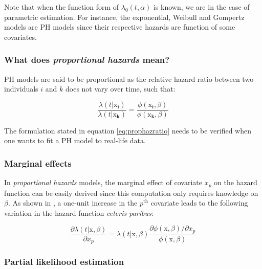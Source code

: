 \documentclass[
]{book}
\begin{document}
Note that when the function form of \(\lambda_0 (t,\alpha)\) is known, we are in the case of parametric estimation. For instance, the exponential, Weibull and Gompertz models are PH models since their respective hazards are function of some covariates.

\hypertarget{what-does-proportional-hazards-mean}{%
\subsubsection*{\texorpdfstring{What does \emph{proportional hazards} mean?}{What does proportional hazards mean?}}\label{what-does-proportional-hazards-mean}}

PH models are said to be proportional as the relative hazard ratio between two individuals \(i\) and \(k\) does not vary over time, such that:

\begin{equation}
  \frac{\lambda(t|\pmb{\mathrm{x}_i})}{\lambda(t|\pmb{\mathrm{x}_k})} = \frac{\phi(\pmb{\mathrm{x}_i}, \beta) }{\phi(\pmb{\mathrm{x}_k}, \beta)}
  \label{eq:prophazratio}
\end{equation}

The formulation stated in equation \eqref{eq:prophazratio} needs to be verified when one wants to fit a PH model to real-life data.

\hypertarget{marginal-effects}{%
\subsubsection*{Marginal effects}\label{marginal-effects}}

In \emph{proportional hazards} models, the marginal effect of covariate \(x_p\) on the hazard function can be easily derived since this computation only requires knowledge on \(\beta\). As shown in \citet{CAMERON_TRIVEDI}, a one-unit increase in the \(p^{\text{th}}\) covariate leads to the following variation in the hazard function \emph{ceteris paribus}:

\begin{equation}
    \frac{\partial \lambda(t|\pmb{\mathrm{x}}, \beta)}{\partial x_p} = \lambda(t|\pmb{\mathrm{x}}, \beta) \frac{\partial \phi(\pmb{\mathrm{x}}, \beta) / \partial x_p}{\phi(\pmb{\mathrm{x}}, \beta) }
    \label{eq:meph}
\end{equation}

\hypertarget{partial-likelihood-estimation}{%
\subsubsection*{Partial likelihood estimation}\label{partial-likelihood-estimation}}
\end{document}
